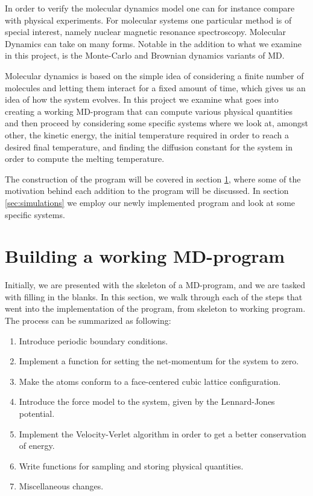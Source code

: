 \documentclass[a4paper]{article}
\begin{document}
    In order to verify the molecular dynamics model one can for instance
    compare with physical experiments. For molecular systems one particular
    method is of special interest, namely nuclear magnetic resonance
    spectroscopy.  Molecular Dynamics can take on many forms. Notable in the
    addition to what we examine in this project, is the Monte-Carlo and
    Brownian dynamics variants of MD. 
     
    Molecular dynamics is based on the simple idea of considering a finite
    number of molecules and letting them interact for a fixed amount of time,
    which gives us an idea of how the system evolves.  In this project we
    examine what goes into creating a working MD-program that can compute
    various physical quantities and then proceed by considering some specific
    systems where we look at, amongst other, the kinetic energy, the initial
    temperature required in order to reach a desired final temperature, and
    finding the diffusion constant for the system in order to compute the
    melting temperature.

    The construction of the program will be covered in section
    \ref{sec:building_a_working_md_program}, where some of the motivation
    behind each addition to the program will be discussed. In section
    \ref{sec:simulations} we employ our newly implemented program and look at
    some specific systems.
    
\section{Building a working MD-program}
\label{sec:building_a_working_md_program}
    
    Initially, we are presented with the skeleton of a MD-program, and we are
    tasked with filling in the blanks. In this section, we walk through each of
    the steps that went into the implementation of the program, from skeleton
    to working program. The process can be summarized as following:
    
    \begin{enumerate}[1)]
        \item Introduce periodic boundary conditions.
        \item Implement a function for setting the net-momentum for the system to zero.
        \item Make the atoms conform to a face-centered cubic lattice configuration.
        \item Introduce the force model to the system, given by the Lennard-Jones potential.
        \item Implement the Velocity-Verlet algorithm in order to get a better
            conservation of energy.
        \item Write functions for sampling and storing physical quantities.
        \item Miscellaneous changes.
    \end{enumerate}
    
\end{document}
